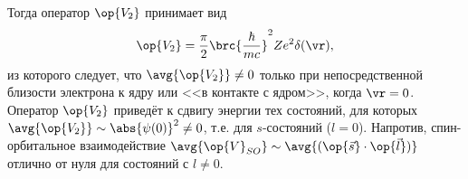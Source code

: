 Тогда оператор $\op{V_2}$ принимает вид
$$
\op{V_2} = \frac{\pi}{2} \brc{\frac{\hbar}{mc}}^2 Ze^2 \delta(\vr),
$$
из которого следует, что $\avg{\op{V_2}} \neq 0$ только при непосредственной близости электрона к ядру или <<в контакте с ядром>>, когда $\vr = 0$. Оператор $\op{V_2}$ приведёт к сдвигу энергии тех состояний, для которых $\avg{\op{V_2}} \sim \abs{\psi(0)}^2 \neq 0$, т.е. для $s$-состояний ($l=0$). Напротив, спин-орбитальное взаимодействие $\avg{\op{V}_{SO}} \sim \avg{(\op{\vec{s}} \cdot \op{\vec{l}})}$ отлично от нуля для состояний с $l \neq 0$.